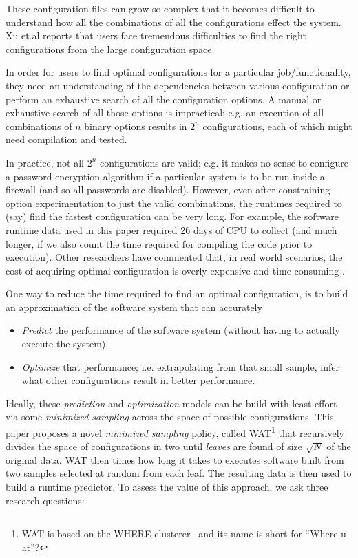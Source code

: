 \documentclass{sig-alternative}
\newcommand{\bi}{\begin{itemize}}%
\newcommand{\ei}{\end{itemize}}
\begin{document}
 These configuration
 files can grow so complex that it becomes difficult
 to understand how all the combinations of all the 
 configurations effect the system\cite{berger2013study}. 
Xu et.al \cite{xu2015hey} reports that users face tremendous difficulties to find the right configurations from the large configuration space. 

 In order for  users to find  optimal configurations for a particular job/functionality, they need an understanding of the dependencies between various configuration or perform an exhaustive search of all the configuration options. 
 A manual or exhaustive search of all those options
 is impractical; e.g.    an execution of all combinations of
 $n$ binary options results in  $2^n$   configurations, each of which might need compilation and tested. 
 
In practice,  not all $2^n$ configurations are valid; e.g. it makes no sense
 to configure a password encryption algorithm if a particular system is to be run inside a firewall (and so all passwords are disabled).  However, even after constraining option experimentation to just the valid combinations,
 the   runtimes required to (say) find the fastest configuration can be very long. 
 For example, the software runtime data used in this paper required  26 days of CPU to collect (and much longer, if we also count the time required
 for compiling the code prior to execution). 
 Other researchers have commented that,  in 
 real world scenarios, the cost of acquiring optimal configuration is overly expensive and time consuming \cite{weiss2008maximizing}.
 
 
 One way to reduce the time required to find an optimal configuration, is  to build an approximation of the software system that  can accurately 
 \bi
 \item {\em Predict} the  performance  of the software system (without having to actually execute the system). 
 \item {\em Optimize} that performance; i.e. extrapolating from that small sample, infer what other configurations   result in better  performance. 
\ei
Ideally, these {\em prediction} and {\em optimization} models can be build with least effort via  some {\em minimized sampling} across the space of possible configurations.
This paper proposes 
a novel {\em minimized sampling} policy, called   WAT\footnote{WAT is based on the WHERE clusterer~\cite{menzies2013local} and its name is short for ``Where u at''?} that recursively divides the space of configurations in two
until {\em leaves} are found of size $\sqrt{N}$ of the original data.
WAT then times how long it takes to executes software
built from two  samples selected at random from  each leaf. The resulting data is then
used to build a runtime predictor.  To assess the value of this approach, we ask three
research questions:
   
\end{document}
